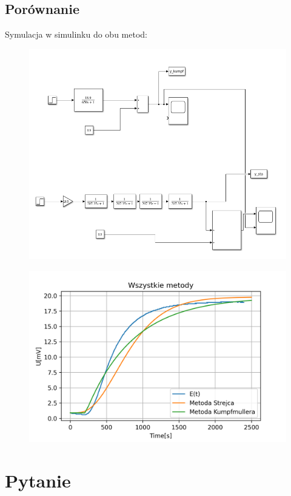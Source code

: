 \documentclass{article}
\begin{document}
\subsection{Porównanie}
Symulacja w simulinku do obu metod:
\begin{figure}[h!]
    \centering
    \includegraphics[scale=0.4]{sim.png}
\end{figure}

\begin{figure}[h!]
    \centering
    \includegraphics[scale=0.7]{metoda_porownanie.png}
\end{figure}

\section{Pytanie}
\end{document}
